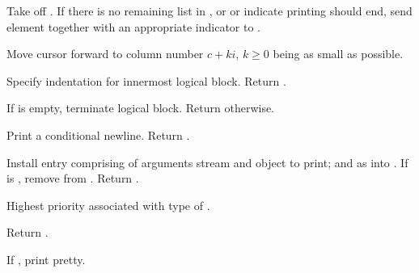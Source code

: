 \begin{LIST}{1cm}
  \begin{LIST}{.5cm}

    {
    Take  off . If there is no remaining
    list in , or  or  indicate
    printing should end, send element together with an appropriate
    indicator to . 
  }

    {
    Move cursor forward to column number $c + ki$, $k \geq 0$ being as small
    as possible.
  }

    {
    Specify indentation for innermost logical block. Return \retval{\NIL}.
  }

    {
    If  is empty, terminate logical block. Return
    \retval{\NIL} otherwise.
  }
    
  \end{LIST}

  {
  Print a conditional newline. Return \retval{\NIL}.
  }

  {
  Install entry comprising  of arguments stream and
  object to print; and  as
   into . If 
  is \NIL, remove  from . Return \retval{\NIL}. 
  }

  {
  Highest priority  associated with type of
  . 
  }

  {
  Return .
  }

  {
  If \T, print pretty.
  }


\end{LIST}
